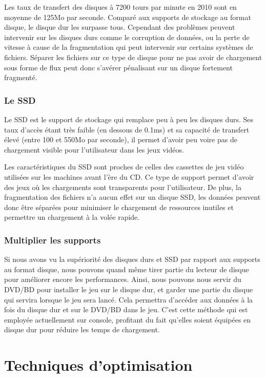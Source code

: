 \documentclass[a4paper, 11pt]{article} %
\begin{document}
Les taux de transfert des disques à 7200 tours par minute en 2010 sont en moyenne de 125Mo par seconde. Comparé aux supports de stockage au format disque, le disque dur les surpasse tous. Cependant des problèmes peuvent intervenir sur les disques durs comme le corruption de données, ou la perte de vitesse à cause de la fragmentation qui peut intervenir sur certains systèmes de fichiers. Séparer les fichiers sur ce type de disque pour ne pas avoir de chargement sous forme de flux peut donc s'avérer pénalisant sur un disque fortement fragmenté.

\newpage
\subsubsection*{Le SSD}
Le SSD est le support de stockage qui remplace peu à peu les disques durs. Ses taux d'accès étant très faible (en dessous de 0.1ms) et sa capacité de transfert élevé (entre 100 et 550Mo par seconde)\cite{hardware:ssdspeed}, il permet d'avoir peu voire pas de chargement visible pour l'utilisateur dans les jeux vidéos. 

Les caractéristiques du SSD sont proches de celles des cassettes de jeu vidéo utilisées sur les machines avant l'ère du CD. Ce type de support permet d'avoir des jeux où les chargements sont transparents pour l'utilisateur. De plus, la fragmentation des fichiers n'a aucun effet sur un disque SSD, les données peuvent donc être séparées pour minimiser le chargement de ressources inutiles et permettre un chargement à la volée rapide.

\subsubsection*{Multiplier les supports}
Si nous avons vu la supériorité des disques durs et SSD par rapport aux supports au format disque, nous pouvons quand même tirer partie du lecteur de disque pour améliorer encore les performances. Ainsi, nous pouvons nous servir du DVD/BD pour installer le jeu sur le disque dur, et garder une partie du disque qui servira lorsque le jeu sera lancé. Cela permettra d'accéder aux données à la fois du disque dur et sur le DVD/BD dans le jeu. C'est cette méthode qui est employée actuellement sur console, profitant du fait qu'elles soient équipées en disque dur pour réduire les temps de chargement.

\newpage
\section*{Techniques d'optimisation}
\end{document}
